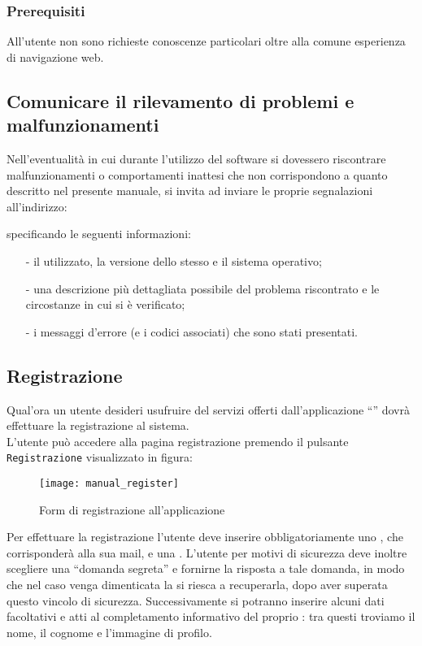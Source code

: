 \subsubsection{Prerequisiti}
All'utente non sono richieste conoscenze particolari oltre alla comune esperienza di navigazione web.

\subsection{Comunicare il rilevamento di problemi e malfunzionamenti}
Nell'eventualità in cui durante l'utilizzo del software \caName{} si dovessero riscontrare malfunzionamenti o comportamenti inattesi che non corrispondono a quanto descritto nel presente manuale, si invita ad inviare le proprie segnalazioni all'indirizzo:
\begin{center}
  \email{}
\end{center}
specificando le seguenti informazioni:
\begin{itemize}[noitemsep,nolistsep]
  \item[-] il  utilizzato, la versione dello stesso e il sistema operativo;
  \item[-] una descrizione più dettagliata possibile del problema riscontrato e le circostanze in cui si è verificato;
  \item[-] i messaggi d'errore (e i codici associati) che sono stati presentati.
\end{itemize}

\subsection{Registrazione}
Qual'ora un utente desideri usufruire del servizi offerti dall'applicazione ``\caName'' dovrà effettuare la registrazione al sistema.\\
L'utente può accedere alla pagina registrazione premendo il pulsante \texttt{Registrazione} visualizzato in figura:

\begin{figure}[H]
  \centering
  \texttt{[image: manual\_register]}
\caption{Form di registrazione all'applicazione}\label{fig:register}
\end{figure}


Per effettuare la registrazione l'utente deve inserire obbligatoriamente uno \underline{}, che corrisponderà alla sua mail, e una .
L'utente per motivi di sicurezza deve inoltre scegliere una ``domanda segreta'' e fornirne la risposta a tale domanda, in modo che nel caso venga dimenticata la  si riesca a recuperarla, dopo aver superata questo vincolo di sicurezza.
Successivamente si potranno inserire alcuni dati facoltativi e atti al completamento informativo del proprio : tra questi troviamo il nome, il cognome e l'immagine di profilo.

